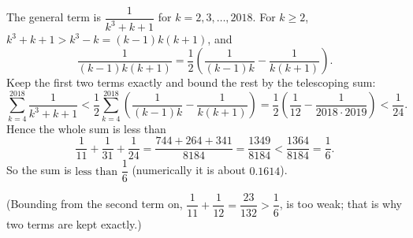 The general term is $\dfrac{1}{k^3+k+1}$ for $k=2,3,\dots,2018$. For $k\ge2$, $k^3+k+1>k^3-k=(k-1)k(k+1)$, and
\[
\dfrac{1}{(k-1)k(k+1)}=\dfrac{1}{2}\left(\dfrac{1}{(k-1)k}-\dfrac{1}{k(k+1)}\right).
\]
Keep the first two terms exactly and bound the rest by the telescoping sum:
\[
\sum_{k=4}^{2018}\dfrac{1}{k^3+k+1}<\dfrac{1}{2}\sum_{k=4}^{2018}\left(\dfrac{1}{(k-1)k}-\dfrac{1}{k(k+1)}\right)=\dfrac{1}{2}\left(\dfrac{1}{12}-\dfrac{1}{2018\cdot2019}\right)<\dfrac{1}{24}.
\]
Hence the whole sum is less than
\[
\dfrac{1}{11}+\dfrac{1}{31}+\dfrac{1}{24}=\dfrac{744+264+341}{8184}=\dfrac{1349}{8184}<\dfrac{1364}{8184}=\dfrac{1}{6} .
\]
So the sum is $\boxed{\text{less than }\dfrac{1}{6}}$ (numerically it is about $0.1614$).

(Bounding from the second term on, $\dfrac{1}{11}+\dfrac{1}{12}=\dfrac{23}{132}>\dfrac{1}{6}$, is too weak; that is why two terms are kept exactly.)
